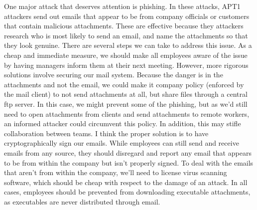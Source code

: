 \documentclass[psamsfonts]{amsart}
\begin{document}
One major attack that deserves attention is phishing. In these attacks, APT1 attackers send out emails that appear to be from company officials or customers that contain malicious attachments. These are effective because they attackers research who is most likely to send an email, and name the attachments so that they look genuine. There are several steps we can take to address this issue. As a cheap and immediate measure, we should make all employees aware of the issue by having managers inform them at their next meeting. However, more rigorous solutions involve securing our mail system. Because the danger is in the attachments and not the email, we could make it company policy (enforced by the mail client) to not send attachments at all, but share files through a central ftp server. In this case, we might prevent some of the phishing, but as we'd still need to open attachments from clients and send attachments to remote workers, an informed attacker could circumvent this policy. In addition, this may stifle collaboration between teams. I think the proper solution is to have cryptographically sign our emails. While employees can still send and receive emails from any source, they should disregard and report any email that appears to be from within the company but isn't properly signed. To deal with the emails that aren't from within the company, we'll need to license virus scanning software, which should be cheap with respect to the damage of an attack. In all cases, employees should be prevented from downloading executable attachments, as executables are never distributed through email.
\end{document}

